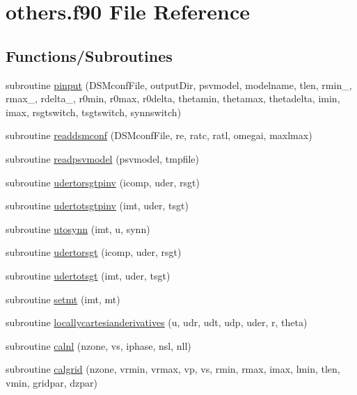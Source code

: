 \hypertarget{others_8f90}{\section{others.\-f90 File Reference}
\label{others_8f90}
}
\subsection*{Functions/\-Subroutines}
\begin{DoxyCompactItemize}
\item 
subroutine \hyperlink{others_8f90_acfbe74ee3a1ca0cb00280244251b6342}{pinput} (D\-S\-Mconf\-File, output\-Dir, psvmodel, modelname, tlen, rmin\-\_\-, rmax\-\_\-, rdelta\-\_\-, r0min, r0max, r0delta, thetamin, thetamax, thetadelta, imin, imax, rsgtswitch, tsgtswitch, synnswitch)
\item 
subroutine \hyperlink{others_8f90_a119fa57ee4503ef8b04931a2d9407e5d}{readdsmconf} (D\-S\-Mconf\-File, re, ratc, ratl, omegai, maxlmax)
\item 
subroutine \hyperlink{others_8f90_a7076cd5066fb84abca20c26bb75d2429}{readpsvmodel} (psvmodel, tmpfile)
\item 
subroutine \hyperlink{others_8f90_a239c399c90e7e86a7aaec419eb3e5961}{udertorsgtpinv} (icomp, uder, rsgt)
\item 
subroutine \hyperlink{others_8f90_a442f67ae00c03f366ee9d7eddc3ff9cc}{udertotsgtpinv} (imt, uder, tsgt)
\item 
subroutine \hyperlink{others_8f90_a425f2bb3c154bc742017069b40743389}{utosynn} (imt, u, synn)
\item 
subroutine \hyperlink{others_8f90_aaa83aca3daa2ca86c51064ca33fbcf36}{udertorsgt} (icomp, uder, rsgt)
\item 
subroutine \hyperlink{others_8f90_afaea15929024abe1f09eabc9f6e6d85f}{udertotsgt} (imt, uder, tsgt)
\item 
subroutine \hyperlink{others_8f90_a9b0bf10df75b570696b56b6d8c5fa917}{setmt} (imt, mt)
\item 
subroutine \hyperlink{others_8f90_a0aaa3f2ed2133f41229688450207bbac}{locallycartesianderivatives} (u, udr, udt, udp, uder, r, theta)
\item 
subroutine \hyperlink{others_8f90_a350757cf4b38a71232bee1da77216b65}{calnl} (nzone, vs, iphase, nsl, nll)
\item 
subroutine \hyperlink{others_8f90_a3fc4da761c0e171370e4516ac89f9320}{calgrid} (nzone, vrmin, vrmax, vp, vs, rmin, rmax, imax, lmin, tlen, vmin, gridpar, dzpar)

\end{DoxyCompactItemize}
